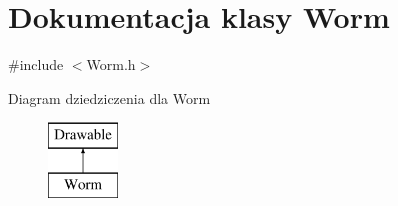 \hypertarget{class_worm}{}\section{Dokumentacja klasy Worm}
\label{class_worm}


{\ttfamily \#include $<$Worm.\+h$>$}

Diagram dziedziczenia dla Worm\begin{figure}[H]
\begin{center}
\leavevmode
\includegraphics[height=2.000000cm]{class_worm}
\end{center}
\end{figure}
